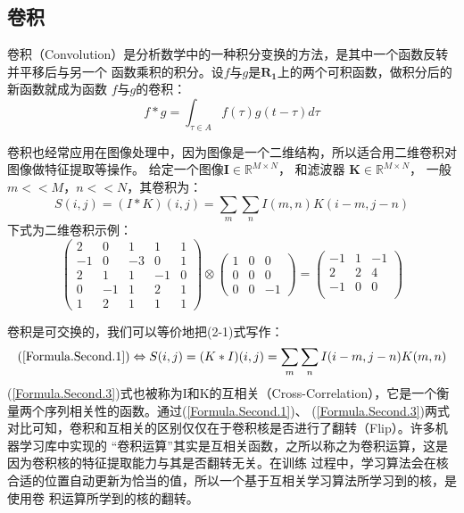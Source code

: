   \subsection{卷积}
  卷积（Convolution）是分析数学中的一种积分变换的方法，是其中一个函数反转并平移后与另一个
  函数乘积的积分。设$f$与$g$是$\mathbf{R_1}$上的两个可积函数，做积分后的新函数就成为函数
  $f$与$g$的卷积：
  \[f*g=\int_{\tau \in A}f(\tau)g(t-\tau) d\tau\]

  卷积也经常应用在图像处理中，因为图像是一个二维结构，所以适合用二维卷积对图像做特征提取等操作。
  给定一个图像$\mathbf{I}\in \mathbb{R}^{M\times N}$，
  和滤波器 $\mathbf{K}\in \mathbb{R}^{M\times N}$，
  一般$m<<M$，$n<<N$，其卷积为：
  \begin{equation}
    S(i,j)=(I*K)(i,j)=\sum_m \sum_n I(m,n)K(i-m,j-n)
    \label{Formula.Second.1}
  \end{equation}
  下式为二维卷积示例：
  \begin{equation}
    {\begin{pmatrix}
    2& 0& 1& 1& 1 \\
    -1& 0& -3& 0& 1\\
    2& 1& 1& -1& 0 \\
    0& -1& 1& 2& 1 \\
    1& 2& 1& 1& 1
    \end{pmatrix}} 
    \otimes 
    {\begin{pmatrix}
      1& 0& 0\\
      0& 0& 0\\
      0& 0& -1
    \end{pmatrix}}
    =
    {\begin{pmatrix}
      -1& 1& -1\\
      2& 2& 4\\
      -1& 0& 0\\
    \end{pmatrix}}
    \label{Formula.Second.2}
  \end{equation}

  卷积是可交换的，我们可以等价地把(2-1)式写作：
  \begin{equation}
    (\ref{Formula.Second.1}) \Leftrightarrow S(i,j)=(K*I)(i,j)=\sum_m \sum_n I(i-m,j-n)K(m,n)
    \label{Formula.Second.3}
  \end{equation}
  (\ref{Formula.Second.3})式也被称为I和K的互相关（Cross-Correlation），它是一个衡量两个序列相关性的函数。通过(\ref{Formula.Second.1})、
  (\ref{Formula.Second.3})两式对比可知，卷积和互相关的区别仅仅在于卷积核是否进行了翻转（Flip）。许多机器学习库中实现的
  “卷积运算”其实是互相关函数，之所以称之为卷积运算，这是因为卷积核的特征提取能力与其是否翻转无关。在训练
  过程中，学习算法会在核合适的位置自动更新为恰当的值，所以一个基于互相关学习算法所学习到的核，是使用卷
  积运算所学到的核的翻转。

